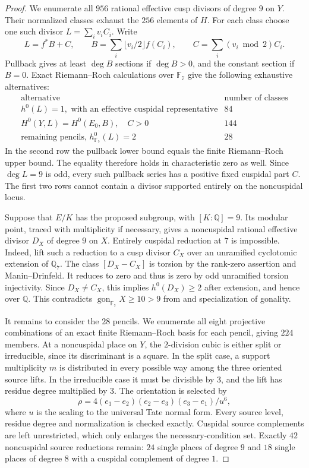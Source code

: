 \begin{proof}
We enumerate all $956$ rational effective cusp divisors of degree $9$
on $Y$. Their normalized classes exhaust the $256$ elements of $H$.
For each class choose one such divisor $L=\sum_i v_iC_i$. Write
\[
 L=f^*B+C,\qquad
 B=\sum_i\lfloor v_i/2\rfloor f(C_i),\qquad
 C=\sum_i(v_i\bmod2)C_i.
\]
Pullback gives at least $\deg B$ sections if $\deg B>0$, and the
constant section if $B=0$. Exact Riemann--Roch calculations over
$\mathbb F_7$ give the following exhaustive alternatives:
\[
\begin{array}{c|r}
\text{alternative}&\text{number of classes}\\\hline
h^0(L)=1,\text{ with an effective cuspidal representative}&84\\
H^0(Y,L)=H^0(E_0,B),\quad C>0&144\\
\text{remaining pencils, }h^0_{\mathbb F_7}(L)=2&28
\end{array}
\]
In the second row the pullback lower bound equals the finite
Riemann--Roch upper bound. The equality therefore holds in
characteristic zero as well. Since $\deg L=9$ is odd, every such
pullback series has a positive fixed cuspidal part $C$.
The first two rows cannot contain a divisor supported entirely on
the noncuspidal locus.

Suppose that $E/K$ has the proposed subgroup, with $[K:\mathbb Q]=9$.
Its modular point, traced with multiplicity if necessary, gives a
noncuspidal rational effective divisor $D_X$ of degree $9$ on $X$.
Entirely cuspidal reduction at $7$ is impossible. Indeed, lift such a
reduction to a cusp divisor $C_X$ over an unramified cyclotomic
extension of $\mathbb Q_7$. The class $[D_X-C_X]$ is torsion by the
rank-zero assertion and Manin--Drinfeld. It reduces to zero and thus
is zero by odd unramified torsion injectivity. Since $D_X\ne C_X$,
this implies $h^0(D_X)\geq2$ after extension, and hence over
$\mathbb Q$. This contradicts
$\operatorname{gon}_{\mathbb F_7}X\geq10>9$ from
\cite[Table~1]{NV} and specialization of gonality.

It remains to consider the $28$ pencils. We enumerate all eight
projective combinations of an exact finite Riemann--Roch basis for
each pencil, giving $224$ members. At a noncuspidal place on $Y$, the
$2$-division cubic is either split or irreducible, since its
discriminant is a square. In the split case, a support multiplicity
$m$ is distributed in every possible way among the three oriented
source lifts. In the irreducible case it must be divisible by $3$,
and the lift has residue degree multiplied by $3$.
The orientation is selected by
\[
 \rho=4(e_1-e_2)(e_2-e_3)(e_3-e_1)/u^6,
\]
where $u$ is the scaling to the universal Tate normal form.
Every source level, residue degree and normalization is checked
exactly. Cuspidal source complements are left unrestricted, which
only enlarges the necessary-condition set. Exactly $42$
noncuspidal source reductions remain: $24$ single places of degree
$9$ and $18$ single places of degree $8$ with a cuspidal complement
of degree $1$.


\end{proof}

